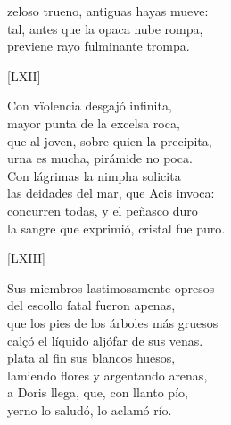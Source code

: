 \documentclass[11pt,a4paper,twoside]{article}
\begin{document}
zeloso trueno, antiguas hayas mueve:\\
tal, antes que la opaca nube rompa,\\
previene rayo fulminante trompa.\par\pend
%
\begin{center}
	[LXII]
\end{center}\pstart
Con vïolencia desgajó infinita,\\
mayor punta de la excelsa roca,\\
que al joven, sobre quien la precipita,\\
urna es mucha, pirámide no poca.\\
Con lágrimas la nimpha solicita\\
las deidades del mar, que Acis invoca:\\
concurren todas, y el peñasco duro\\
la sangre que exprimió, cristal fue puro.\par\pend
%
\begin{center}
	[LXIII]
\end{center}\pstart
Sus miembros lastimosamente opresos\\
del escollo fatal fueron apenas,\\
que los pies de los árboles más gruesos\\
calçó el líquido aljófar de sus venas.\\
 plata al fin sus blancos huesos,\\
lamiendo flores y argentando arenas,\\
a Doris llega, que, con llanto pío,\\
yerno lo saludó, lo aclamó río.\par\pend
\endnumbering
\relax
\vfill
\end{document}
